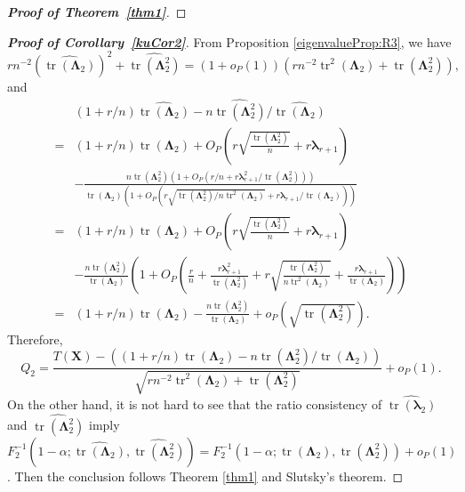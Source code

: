\documentclass[12pt]{article} %
\DeclareMathOperator{\mytr}{tr}
\newcommand{\bX}{\mathbf{X}}
\newcommand{\bfsym}[1]{\ensuremath{\boldsymbol{#1}}}
\def\blambda {\bfsym {\lambda}}
\def\bLambda {\bfsym {\Lambda}}
\theoremstyle{definition}
\begin{document}
\begin{appendices}
\begin{proof}[\textbf{Proof of Theorem~\ref{thm1}}]
\end{proof}
\begin{proof}[\textbf{Proof of Corollary~\ref{kuCor2}}]
    From Proposition \ref{eigenvalueProp:R3},
    we have
    $$
rn^{-2} (\widehat{\mytr ( \bLambda_2 )})^2 +\widehat{\mytr(\bLambda_2^2)}
=
(1+o_P(1))(rn^{-2} \mytr^2 ( \bLambda_2 ) + \mytr(\bLambda_2^2)),
    $$
    and
    \begin{equation*}
        \begin{split}
    &(1+r/n)\widehat{\mytr(\bLambda_2)}-n\widehat{\mytr(\bLambda_2^2)}/\widehat{\mytr(\bLambda_2)}
    \\
    =&(1+r/n)\mytr(\bLambda_2)
    +O_P\left(r\sqrt{\frac{\mytr(\bLambda_2^2)}{n}}+r\blambda_{r+1}\right)
    \\
    &-\frac{n\mytr(\bLambda_2^2)\left(1+O_P\left(r/n +{r\blambda_{r+1}^2}/{\mytr(\bLambda_2^2)}\right)\right)}
    {\mytr(\bLambda_2)\left(1+O_P\left(r\sqrt{\mytr(\bLambda_2^2)/n\mytr^2(\bLambda_2)}+r\blambda_{r+1}/\mytr(\bLambda_2)\right)\right)}
    \\
    =&(1+r/n)\mytr(\bLambda_2)
    +O_P\left(r\sqrt{\frac{\mytr(\bLambda_2^2)}{n}}+r\blambda_{r+1}\right)
    \\
    &-\frac{n\mytr(\bLambda_2^2)}{\mytr(\bLambda_2)}
\left(1+O_P\left(\frac r n +\frac{r\blambda_{r+1}^2}{\mytr(\bLambda_2^2)}
+r\sqrt{\frac{\mytr(\bLambda_2^2)}{n\mytr^2(\bLambda_2)}}+\frac{r\blambda_{r+1}}{\mytr(\bLambda_2)}\right)\right)
\\
    =&(1+r/n)\mytr(\bLambda_2)-\frac{n\mytr(\bLambda_2^2)}{\mytr(\bLambda_2)}
    +o_P\left(\sqrt{\mytr(\bLambda_2^2)}\right).
        \end{split}
    \end{equation*}
Therefore,
    \begin{equation*}
        Q_2=
\frac{
    T(\bX)
    -
    \left((1+r/n)\mytr(\bLambda_2)-n\mytr(\bLambda_2^2)/\mytr(\bLambda_2)\right)
}{
    \sqrt{
        rn^{-2}\mytr^2(\bLambda_2)+ 
        \mytr(\bLambda_2^2)
    }
}
+o_P(1).
    \end{equation*}
    On the other hand,
    it is not hard to see that the ratio consistency of $\widehat{\mytr(\blambda_2)}$ and $\widehat{\mytr(\bLambda_2^2)}$ imply
     $F_2^{-1}(1-\alpha;\widehat{\mytr(\bLambda_2)},\widehat{\mytr(\bLambda_2^2)})=F_2^{-1}(1-\alpha;\mytr(\bLambda_2),\mytr(\bLambda_2^2))+o_P(1)$.
     Then the conclusion follows Theorem \ref{thm1} and Slutsky's theorem.
\end{proof}


\end{appendices}
\end{document}
